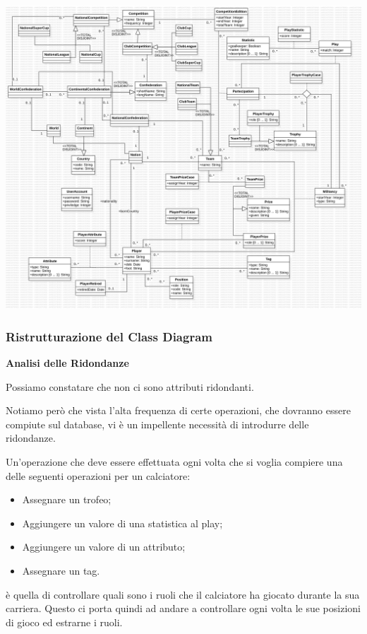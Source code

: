 \includegraphics[width=\textwidth]{res/class_diagram_not_ristr}
\newpage

\subsubsection{\Large Ristrutturazione del Class Diagram}

\textbf{\large Analisi delle Ridondanze}

Possiamo constatare che non ci sono attributi ridondanti.

Notiamo però che vista l'alta frequenza di certe operazioni, 
che dovranno essere compiute sul database, vi è
un impellente necessità di introdurre delle ridondanze.


Un'operazione che deve essere effettuata ogni volta che
si voglia compiere una delle seguenti operazioni
per un calciatore:
\begin{itemize}
	\item Assegnare un trofeo;
	\item Aggiungere un valore di una statistica
		al play;
	\item Aggiungere un valore di un attributo;
	\item Assegnare un tag.
\end{itemize}
è quella di controllare quali sono i ruoli
che il calciatore ha giocato durante la sua carriera.
Questo ci porta quindi ad andare a controllare ogni volta
le sue posizioni di gioco ed estrarne i ruoli.

